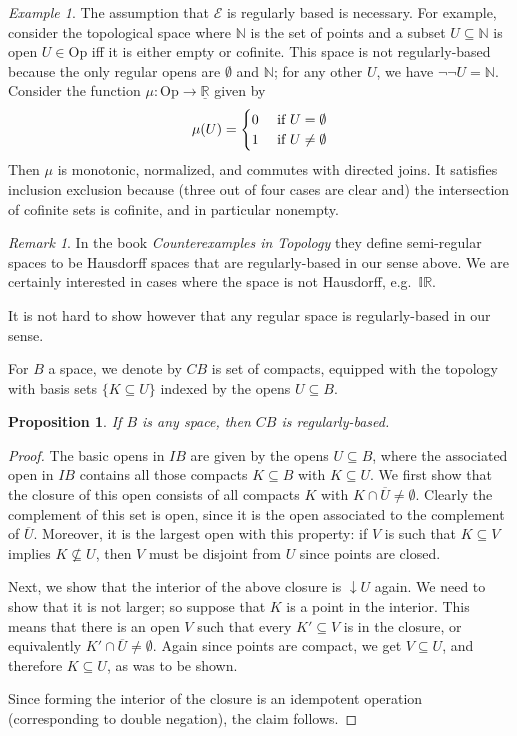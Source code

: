 \documentclass[11pt, oneside, article]{memoir}
\theoremstyle{plain}
\newtheorem{proposition}[theorem]{Proposition}
\theoremstyle{definition}
\theoremstyle{remark}
\newtheorem{example}[theorem]{Example}
\newtheorem{remark}[theorem]{Remark}
\renewcommand{\ss}{\subseteq}
\newcommand{\Set}[1]{\mathrm{#1}}
\newcommand{\cat}[1]{\mathcal{#1}}
\newcommand{\tn}[1]{\textnormal{#1}}
\newcommand{\ul}[1]{\underline{#1}}
\newcommand{\IR}{\mathbb{IR}} %
\newcommand{\NN}{\mathbb{N}}
\newcommand{\LR}{\ul{\mathbb{R}}}
\newcommand{\Op}{\Set{Op}}
\begin{document}
\begin{example}
The assumption that $\cat{E}$ is regularly based is necessary. For example, consider the topological space where $\NN$ is the set of points and a subset $U\ss\NN$ is open $U\in \Op$ iff it is either empty or cofinite. This space is not regularly-based because the only regular opens are $\emptyset$ and $\NN$; for any other $U$, we have $\neg\neg U=\NN$. Consider the function $\mu\colon\Op\to\LR$ given by
\[\mu(U)=\begin{cases}0&\tn{ if }U=\emptyset\\1&\tn{ if }U\neq\emptyset\end{cases}\]
Then $\mu$ is monotonic, normalized, and commutes with directed joins. It satisfies inclusion exclusion because (three out of four cases are clear and) the intersection of cofinite sets is cofinite, and in particular nonempty.
\end{example}

\begin{remark}
In the book \emph{Counterexamples in Topology} they define semi-regular spaces to be Hausdorff spaces that are regularly-based in our sense above. We are certainly interested in cases where the space is not Hausdorff, e.g.\ $\IR$.

It is not hard to show however that any regular space is regularly-based in our sense.
\end{remark}

For $B$ a space, we denote by $CB$ is set of compacts, equipped with the topology with basis sets $\{ K \subseteq U \}$ indexed by the opens $U \subseteq B$.

\begin{proposition}
If $B$ is any space, then $CB$ is regularly-based.
\end{proposition}

\begin{proof}
The basic opens in $IB$ are given by the opens $U\subseteq B$, where the associated open in $IB$ contains all those compacts $K\subseteq B$ with $K\subseteq U$. We first show that the closure of this open consists of all compacts $K$ with $K\cap\overline{U} \neq \emptyset$. Clearly the complement of this set is open, since it is the open associated to the complement of $\overline{U}$. Moreover, it is the largest open with this property: if $V$ is such that $K\subseteq V$ implies $K \not\subseteq U$, then $V$ must be disjoint from $U$ since points are closed.

Next, we show that the interior of the above closure is $\downarrow U$ again. We need to show that it is not larger; so suppose that $K$ is a point in the interior. This means that there is an open $V$ such that every $K' \subseteq V$ is in the closure, or equivalently $K' \cap \overline{U} \neq \emptyset$. Again since points are compact, we get $V \subseteq U$, and therefore $K \subseteq U$, as was to be shown.

Since forming the interior of the closure is an idempotent operation (corresponding to double negation), the claim follows.
\end{proof}
\end{document}
